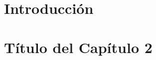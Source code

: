 \documentclass[a4paper,12pt,oneside]{report}
\begin{document}
\pagestyle{myheadings} %



\renewcommand{\thepage}{\roman{page}}
\setcounter{page}{1}
\pagestyle{plain} 


\tableofcontents

\newpage{\pagestyle{empty}}

\listoffigures

\newpage{\pagestyle{empty}}

\listoftables

\newpage{\pagestyle{empty}}

\newpage
\thispagestyle{empty}

\renewcommand{\thepage}{\arabic{page}}
\setcounter{page}{1}
\pagestyle{plain}

\chapter{\LARGE Introducción}
\label{chapter:intro}



\newpage{\pagestyle{empty}}
\thispagestyle{empty}

\chapter{\LARGE Título del Capítulo 2}
\label{chapter:dos}



\newpage{\pagestyle{empty}}
\thispagestyle{empty}
\end{document}
